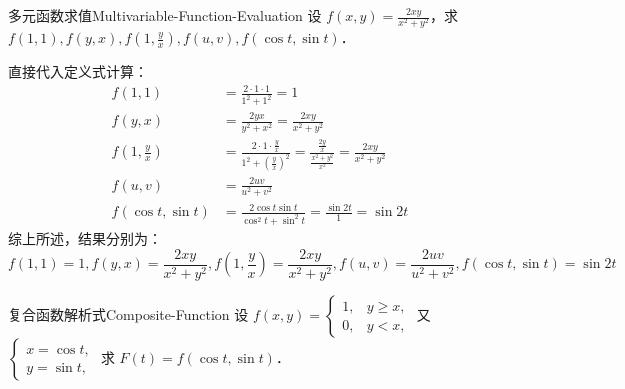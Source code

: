 \begin{problem}{多元函数求值}{Multivariable-Function-Evaluation}
    设 $f(x, y) = \frac{2xy}{x^2+y^2}$，求 $f(1, 1), f(y, x), f(1, \frac{y}{x}), f(u, v), f(\cos t, \sin t)$．
\end{problem}

\begin{solution}
    直接代入定义式计算：
    \begin{equation}
        \begin{aligned}
            f(1, 1)                        & = \frac{2 \cdot 1 \cdot 1}{1^2 + 1^2} = 1                                                                                                     \\
            f(y, x)                        & = \frac{2yx}{y^2 + x^2} = \frac{2xy}{x^2 + y^2}                                                                                               \\
            f\left( 1, \frac{y}{x} \right) & = \frac{2 \cdot 1 \cdot \frac{y}{x}}{1^2 + \left( \frac{y}{x} \right)^2} = \frac{\frac{2y}{x}}{\frac{x^2 + y^2}{x^2}} = \frac{2xy}{x^2 + y^2} \\
            f(u, v)                        & = \frac{2uv}{u^2 + v^2}                                                                                                                       \\
            f(\cos t, \sin t)              & = \frac{2\cos t \sin t}{\cos^2 t + \sin^2 t} = \frac{\sin 2t}{1} = \sin 2t
        \end{aligned}
    \end{equation}
    综上所述，结果分别为：
    \begin{equation}
        \boxed{f(1, 1) = 1, f(y, x) = \frac{2xy}{x^2+y^2}, f\left( 1, \frac{y}{x} \right) = \frac{2xy}{x^2+y^2}, f(u, v) = \frac{2uv}{u^2+v^2}, f(\cos t, \sin t) = \sin 2t}
    \end{equation}
\end{solution}

\begin{problem}{复合函数解析式}{Composite-Function}
    设 $f(x, y) = \begin{cases} 1, & y \ge x, \\ 0, & y < x, \end{cases}$ 又 $\begin{cases} x = \cos t, \\ y = \sin t, \end{cases}$ 求 $F(t) = f(\cos t, \sin t)$．
\end{problem}

